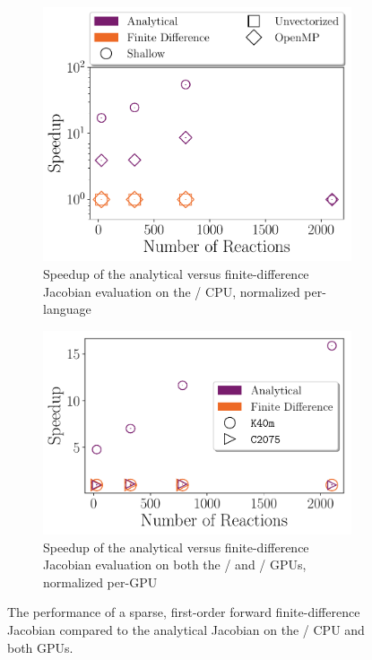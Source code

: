 \documentclass[12pt,number,sort&compress,preprint]{elsarticle}
\begin{document}
\begin{figure}[htbp]
   \centering
  \begin{subfigure}[t]{0.48\linewidth}
      \includegraphics[width=\textwidth]{finite_difference_vs_analytical.pdf}
      \caption{Speedup of the analytical versus finite-difference Jacobian evaluation on the \avx/ CPU, normalized per-language}
      \label{F:fd_vs_analytical_cpu}
  \end{subfigure}
  \hfill
  \begin{subfigure}[t]{0.48\linewidth}
      \includegraphics[width=\textwidth]{finite_difference_vs_analytical_gpu.pdf}
      \caption{Speedup of the analytical versus finite-difference Jacobian evaluation on both the \gpunew/ and \gpuold/ GPUs, normalized per-GPU}
      \label{F:fd_vs_analytical_gpu}
  \end{subfigure}
  \caption{The performance of a sparse, first-order forward finite-difference Jacobian compared to the analytical Jacobian on the \avx/ CPU and both GPUs.}
  \label{F:fd_vs_analytical}
\end{figure}
\end{document}
